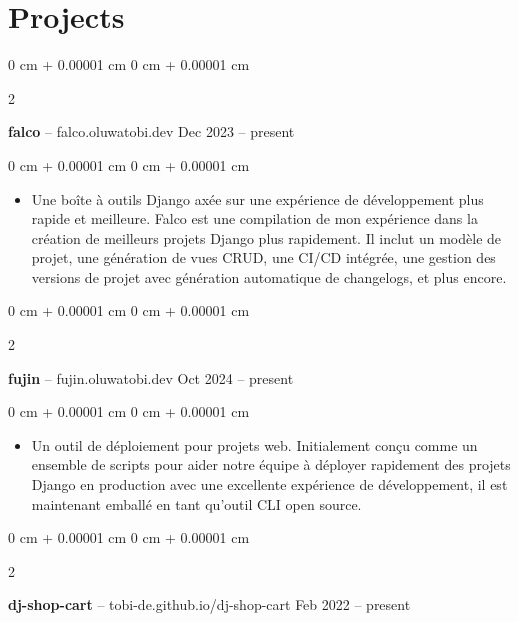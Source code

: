 \documentclass[10pt, letterpaper]{article}
\newenvironment{highlights}{
    \begin{itemize}[
        topsep=0.10 cm,
        parsep=0.10 cm,
        partopsep=0pt,
        itemsep=0pt,
        leftmargin=0 cm + 10pt
    ]
}{
    \end{itemize}
} %
\newenvironment{onecolentry}{
    \begin{adjustwidth}{
        0 cm + 0.00001 cm
    }{
        0 cm + 0.00001 cm
    }
}{
    \end{adjustwidth}
} %
\newenvironment{twocolentry}[2][]{
    \onecolentry
    \def\secondColumn{#2}
    \setcolumnwidth{\fill, 4.5 cm}
    \begin{paracol}{2}
}{
    \switchcolumn \raggedleft \secondColumn
    \end{paracol}
    \endonecolentry
} %
\begin{document}
    
    \section{Projects}



        
        \begin{twocolentry}{
            Dec 2023 – present
        }
            \textbf{falco} -- falco.oluwatobi.dev\end{twocolentry}

        \vspace{0.10 cm}
        \begin{onecolentry}
            \begin{highlights}
                \item Une boîte à outils Django axée sur une expérience de développement plus rapide et meilleure. Falco est une compilation de mon expérience dans la création de meilleurs projets Django plus rapidement. Il inclut un modèle de projet, une génération de vues CRUD, une CI/CD intégrée, une gestion des versions de projet avec génération automatique de changelogs, et plus encore.
            \end{highlights}
        \end{onecolentry}


        \vspace{0.2 cm}

        \begin{twocolentry}{
            Oct 2024 – present
        }
            \textbf{fujin} -- fujin.oluwatobi.dev\end{twocolentry}

        \vspace{0.10 cm}
        \begin{onecolentry}
            \begin{highlights}
                \item Un outil de déploiement pour projets web. Initialement conçu comme un ensemble de scripts pour aider notre équipe à déployer rapidement des projets Django en production avec une excellente expérience de développement, il est maintenant emballé en tant qu'outil CLI open source.
            \end{highlights}
        \end{onecolentry}


        \vspace{0.2 cm}

        \begin{twocolentry}{
            Feb 2022 – present
        }
            \textbf{dj-shop-cart} -- tobi-de.github.io/dj-shop-cart\end{twocolentry}
\end{document}
